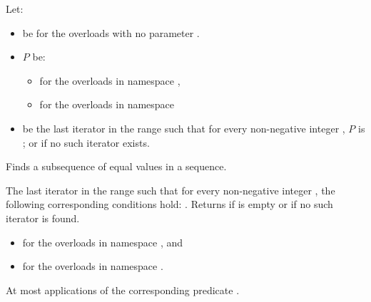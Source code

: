 \begin{itemdescr}
\begin{addedblock}
\pnum
Let:
\begin{itemize}
\item {} be  for the overloads with no parameter
.

\item $P$ be:
\begin{itemize}
\item {}
for the overloads in namespace ,

\item {}
for the overloads in namespace 
\end{itemize}

\item {} be the last iterator in the range
such that for every non-negative integer
, $P$ is ;
or  if no such iterator exists.
\end{itemize}
\end{addedblock}

\pnum
\effects
Finds a subsequence of equal values in a sequence.

\begin{removedblock}
\pnum
\returns
The last iterator
in the range 
such that for every non-negative integer
,
the following corresponding conditions hold:
.
Returns 
if
 is empty or if
no such iterator is found.
\end{removedblock}

\begin{addedblock}
\pnum
\returns
\begin{itemize}
\item {} for the overloads in namespace , and
\item {}
  for the overloads in namespace .
\end{itemize}
\end{addedblock}

\pnum
\complexity
At most
applications of the corresponding predicate .
\end{itemdescr}

